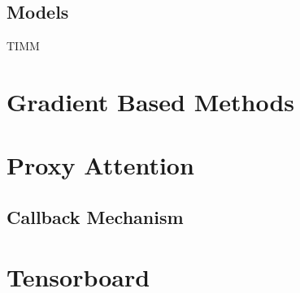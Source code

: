\subsection{Models}
TIMM

\section{Gradient Based Methods}
\section{Proxy Attention}



\subsection{Callback Mechanism}
\section{Tensorboard}
